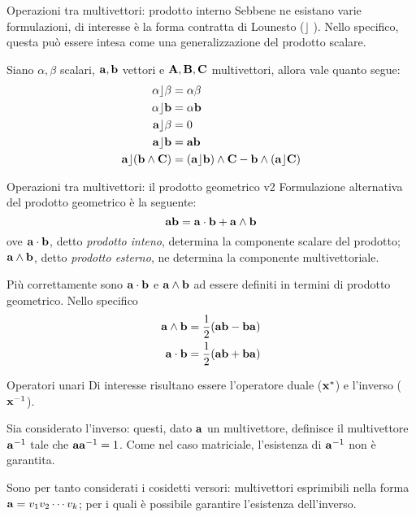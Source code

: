 \begin{frame}{Operazioni tra multivettori: prodotto interno}
    Sebbene ne esistano varie formulazioni, 
    di interesse è la forma contratta di Lounesto (\(\rfloor\) ). 
    Nello specifico, questa può essere intesa come una generalizzazione del 
    prodotto scalare. 

    Siano \(\alpha, \beta\) scalari, \(\mathbf{a}, \mathbf{b}\) vettori e \(\mathbf{A}, 
    \mathbf{B}, \mathbf{C}\) multivettori, allora vale quanto segue:
    \[\begin{aligned}
        \alpha \rfloor \beta & = \alpha\beta \\
        \alpha \rfloor \mathbf{b} & = \alpha\mathbf{b} \\ 
        \mathbf{a} \rfloor \beta & = 0 \\ 
        \mathbf{a} \rfloor \mathbf{b} & = \mathbf{ab} \\ 
        \mathbf{a} \rfloor (\mathbf{b} \wedge \mathbf{C}) & = 
            (\mathbf{a} \rfloor \mathbf{b}) \wedge \mathbf{C} - \mathbf{b} \wedge (\mathbf{a} \rfloor \mathbf{C})
    \end{aligned}\]
\end{frame}
\begin{frame}{Operazioni tra multivettori: il prodotto geometrico v2}
    Formulazione alternativa del prodotto geometrico è la seguente:
    \[
        \mathbf{ab} = \mathbf{a} \cdot \mathbf{b} + \mathbf{a} \wedge \mathbf{b}
    \]
    ove \(\mathbf{a} \cdot \mathbf{b}\), detto \emph{prodotto inteno},
    determina la componente scalare del prodotto; 
    \(\mathbf{a} \wedge \mathbf{b}\), detto \emph{prodotto esterno},
    ne determina la componente multivettoriale.

    Più correttamente sono \(\mathbf{a} \cdot \mathbf{b}\) e \(\mathbf{a} \wedge \mathbf{b}\)
    ad essere definiti in termini di prodotto geometrico. 
    Nello specifico
    \[\begin{aligned}
        \mathbf{a} \wedge \mathbf{b} = \frac{1}{2}(\mathbf{ab} - \mathbf{ba}) \\ 
        \mathbf{a} \cdot \mathbf{b} = \frac{1}{2}(\mathbf{ab} + \mathbf{ba})
    \end{aligned}\]
\end{frame}
\begin{frame}{Operatori unari}
    Di interesse risultano essere l'operatore duale (\(\mathbf{x}^{*}\))
    e l'inverso (\(\mathbf{x}^{-1}\)).

    Sia considerato l'inverso: questi, dato \(\mathbf{a}\) un multivettore,
    definisce il multivettore \(\mathbf{a}^{-1}\) tale che \(\mathbf{a}\mathbf{a}^{-1} = 1\).
    Come nel caso matriciale, l'esistenza di \(\mathbf{a}^{-1}\) non è garantita.

    Sono per tanto considerati i cosidetti versori: 
    multivettori esprimibili nella forma \(\mathbf{a} = v_{1}v_{2}\cdots v_{k}\);
    per i quali è possibile garantire l'esistenza dell'inverso.
\end{frame}
